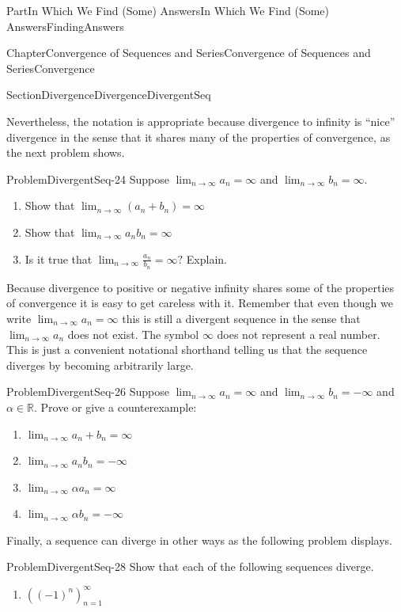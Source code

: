 \documentclass[oneside,10pt,]{book}
\numberwithin{equation}{part}
\def\limit#1#2#3{{\displaystyle\lim_{#1\rightarrow #2}#3}}
\newcommand{\RR}{\mathbb {R}}
\begin{document}
\begin{partptx}{Part}{In Which We Find (Some) Answers}{}{In Which We Find (Some) Answers}{}{}{FindingAnswers}
\begin{chapterptx}{Chapter}{Convergence of Sequences and Series}{}{Convergence of Sequences and Series}{}{}{Convergence}
\begin{sectionptx}{Section}{Divergence}{}{Divergence}{}{}{DivergentSeq}
\par
Nevertheless, the notation is appropriate because divergence to infinity is ``nice'' divergence in the sense that it shares many of the properties of convergence, as the next problem shows.%
\begin{problem}{Problem}{}{DivergentSeq-24}%
Suppose \(\limit{n}{\infty}{a_n}=\infty\) and \(\limit{n}{\infty}{b_n}=\infty\).%
\begin{enumerate}[font=\bfseries,label=(\alph*),ref=\alph*]%
\item{}Show that \(\limit{n}{\infty}{(a_n+b_n)}=\infty\)%
\item{}Show that \(\limit{n}{\infty}{a_nb_n}=\infty\)%
\item{}Is it true that \(\limit{n}{\infty}{\frac{a_n}{b_n}}=\infty?\) Explain.%
\end{enumerate}%
\end{problem}
Because divergence to positive or negative infinity shares some of the properties of convergence it is easy to get careless with it.  Remember that even though we write \(\limit{n}{\infty}{a_n}=\infty\) this is still a divergent sequence in the sense that \(\limit{n}{\infty}{a_n}\) does not exist.  The symbol \(\infty\) does not represent a real number.  This is just a convenient notational shorthand telling us that the sequence diverges by becoming arbitrarily large.%
\begin{problem}{Problem}{}{DivergentSeq-26}%
Suppose \(\limit{n}{\infty}{a_n}=\infty\) and \(\limit{n}{\infty}{b_n}=-\infty\) and \(\alpha\in\RR\).  Prove or give a counterexample:%
\begin{enumerate}[font=\bfseries,label=(\alph*),ref=\alph*]%
\item{}\(\limit{n}{\infty}{a_n+b_n}=\infty\)%
\item{}\(\limit{n}{\infty}{a_nb_n}=-\infty\)%
\item{}\(\limit{n}{\infty}{\alpha a_n}=\infty\)%
\item{}\(\limit{n}{\infty}{\alpha b_n}=-\infty\)%
\end{enumerate}%
\end{problem}
Finally, a sequence can diverge in other ways as the following problem displays.%
\begin{problem}{Problem}{}{DivergentSeq-28}%
Show that each of the following sequences diverge.%
\begin{enumerate}[font=\bfseries,label=(\alph*),ref=\alph*]%
\item{}\(\left(\left(-1\right)^n\right)_{n=1}^\infty\)%

\end{enumerate}
\end{problem}
\end{sectionptx}
\end{chapterptx}
\end{partptx}
\end{document}
